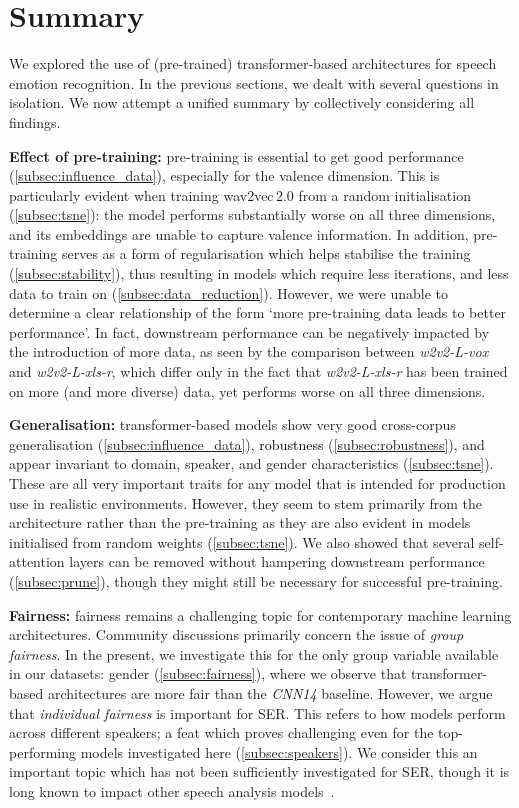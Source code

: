 \documentclass{article}
\newcommand\cnn{\mbox{\emph{CNN14}}}
\newcommand\wvox{\mbox{\emph{w2v2-L-vox}}}
\newcommand\wxlsr{\mbox{\emph{w2v2-L-xls-r}}}
\newcommand{\review}[1]{\textcolor{black}{#1}}
\newcommand{\wtov}{wav2vec\,2.0}
\begin{document}
\section{Summary}
\label{sec:summary}

We explored the use of (pre-trained) transformer-based architectures for speech emotion recognition.
In the previous sections, we dealt with several questions in isolation.
We now attempt a unified summary by collectively considering all findings.

\textbf{Effect of pre-training:}
pre-training is essential to get good performance (\cref{subsec:influence_data}),
especially for the valence dimension.
This is particularly evident
when training {\wtov} from a random initialisation (\cref{subsec:tsne}):
the model performs substantially worse on all three dimensions,
and its embeddings are unable to capture valence information.
In addition,
pre-training serves as a form of regularisation
which helps stabilise the training (\cref{subsec:stability}),
thus resulting in models which require less iterations,
and less data to train on (\cref{subsec:data_reduction}).
However, we were unable to determine a clear relationship of the form
`more pre-training data leads to better performance'.
In fact, downstream performance can be negatively impacted by the introduction of more data,
as seen by the comparison between {\wvox} and {\wxlsr},
which differ only in the fact that {\wxlsr} has been trained on more (and more diverse) data,
yet performs worse on all three dimensions.

\textbf{Generalisation:}
transformer-based models show very good cross-corpus generalisation (\cref{subsec:influence_data}),
\review{robustness} (\cref{subsec:robustness}),
and appear invariant to domain, speaker, and gender characteristics (\cref{subsec:tsne}).
These are all very important traits for any model
that is intended for production use in realistic environments.
However, they seem to stem primarily from the architecture
rather than the pre-training
as they are also evident in models initialised from random weights (\cref{subsec:tsne}).
We also showed that several self-attention layers can be removed
without hampering downstream performance (\cref{subsec:prune}),
though they might still be necessary for successful pre-training.

\textbf{Fairness:}
fairness remains a challenging topic for contemporary machine learning architectures.
Community discussions primarily concern the issue of \emph{group fairness}.
In the present, we investigate this for the only group variable available in our datasets:
gender (\cref{subsec:fairness}),
where we observe that transformer-based architectures are more fair than the {\cnn} baseline.
However, we argue that \emph{individual fairness} is important for \ac{SER}.
This refers to how models perform across different speakers;
a feat which proves challenging even for the top-performing models investigated here (\cref{subsec:speakers}).
We consider this an important topic which has not been sufficiently investigated for \ac{SER},
though it is long known to impact other speech analysis models~\citep{doddington1998sheep,rajan2021fairness}.
\end{document}
